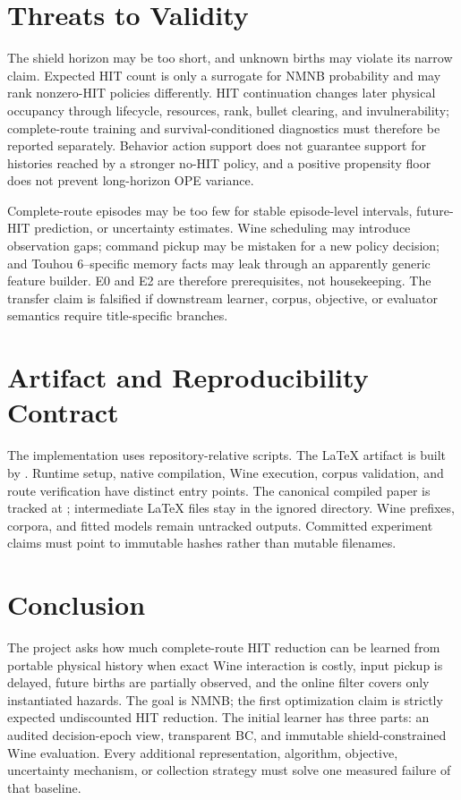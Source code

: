 \documentclass[11pt]{article}
\begin{document}
\section{Threats to Validity}

The shield horizon may be too short, and unknown births may violate its narrow
claim.  Expected HIT count is only a surrogate for NMNB probability and may
rank nonzero-HIT policies differently.  HIT continuation changes later
physical occupancy through lifecycle, resources, rank, bullet clearing, and
invulnerability; complete-route training and survival-conditioned diagnostics
must therefore be reported separately.  Behavior action support does not
guarantee support for histories reached by a stronger no-HIT policy, and a
positive propensity floor does not prevent long-horizon OPE variance.

Complete-route episodes may be too few for stable episode-level intervals,
future-HIT prediction, or uncertainty estimates.  Wine scheduling may
introduce observation gaps; command pickup may be mistaken for a new policy
decision; and Touhou 6--specific memory facts may leak through an apparently
generic feature builder.  E0 and E2 are therefore prerequisites, not
housekeeping.  The transfer claim is falsified if downstream learner, corpus,
objective, or evaluator semantics require title-specific branches.

\section{Artifact and Reproducibility Contract}

The implementation uses repository-relative scripts.  The LaTeX artifact is
built by .  Runtime setup, native compilation,
Wine execution, corpus validation, and route verification have distinct entry
points.  The canonical compiled paper is tracked at ;
intermediate LaTeX files stay in the ignored  directory.
Wine prefixes, corpora, and fitted models remain untracked outputs.  Committed
experiment claims must point to immutable hashes rather than mutable filenames.

\section{Conclusion}

The project asks how much complete-route HIT reduction can be learned from
portable physical history when exact Wine interaction is costly, input pickup
is delayed, future births are partially observed, and the online filter covers
only instantiated hazards.  The goal is NMNB; the first optimization claim is
strictly expected undiscounted HIT reduction.  The initial learner has three
parts: an audited decision-epoch view, transparent BC, and immutable
shield-constrained Wine evaluation.  Every additional representation,
algorithm, objective, uncertainty mechanism, or collection strategy must solve
one measured failure of that baseline.
\end{document}
